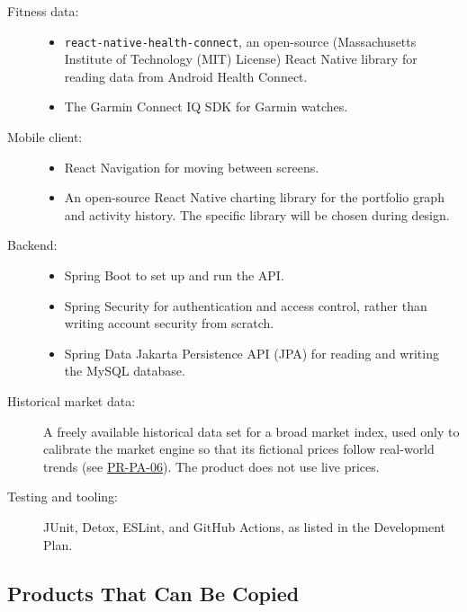 \documentclass[12pt]{article}
\newcommand{\acr}[3]{\phantomsection\label{acr:#1}#2 (#3)}
\begin{document}
\begin{description}
  \item[Fitness data:]\leavevmode
  \begin{itemize}
    \item \texttt{react-native-health-connect}, an open-source (\acr{MIT}{Massachusetts Institute of Technology}{MIT} License) React
    Native library for reading data from Android Health Connect.
    \item The Garmin Connect IQ SDK for Garmin watches.
  \end{itemize}

  \item[Mobile client:]\leavevmode
  \begin{itemize}
    \item React Navigation for moving between screens.
    \item An open-source React Native charting library for the portfolio graph
    and activity history. The specific library will be chosen during design.
  \end{itemize}

  \item[Backend:]\leavevmode
  \begin{itemize}
    \item Spring Boot to set up and run the API.
    \item Spring Security for authentication and access control, rather than
    writing account security from scratch.
    \item Spring Data \acr{JPA}{Jakarta Persistence API}{JPA} for reading and writing the MySQL database.
  \end{itemize}

  \item[Historical market data:] A freely available historical data set for a
  broad market index, used only to calibrate the market engine so that its
  fictional prices follow real-world trends (see \hyperlink{req:PR-PA-06}{PR-PA-06}). The product does
  not use live prices.

  \item[Testing and tooling:] JUnit, Detox, ESLint, and GitHub Actions, as
  listed in the Development Plan.
\end{description}

\subsection{Products That Can Be Copied}
\end{document}
